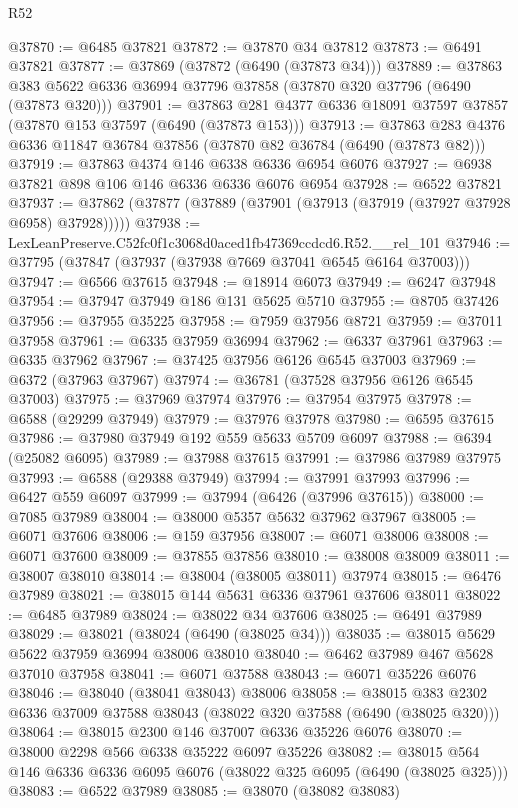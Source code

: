 \begin{lexlean}{R52}
\begin{coremodule}
@37870 := @6485 @37821
@37872 := @37870 @34 @37812
@37873 := @6491 @37821
@37877 := @37869 (@37872 (@6490 (@37873 @34)))
@37889 := @37863 @383 @5622 @6336 @36994 @37796 @37858 (@37870 @320 @37796 (@6490 (@37873 @320)))
@37901 := @37863 @281 @4377 @6336 @18091 @37597 @37857 (@37870 @153 @37597 (@6490 (@37873 @153)))
@37913 := @37863 @283 @4376 @6336 @11847 @36784 @37856 (@37870 @82 @36784 (@6490 (@37873 @82)))
@37919 := @37863 @4374 @146 @6338 @6336 @6954 @6076
@37927 := @6938 @37821 @898 @106 @146 @6336 @6336 @6076 @6954
@37928 := @6522 @37821
@37937 := @37862 (@37877 (@37889 (@37901 (@37913 (@37919 (@37927 @37928 @6958) @37928)))))
@37938 := LexLeanPreserve.C52fc0f1c3068d0aced1fb47369ccdcd6.R52.__rel_101
@37946 := @37795 (@37847 (@37937 (@37938 @7669 @37041 @6545 @6164 @37003)))
@37947 := @6566 @37615
@37948 := @18914 @6073
@37949 := @6247 @37948
@37954 := @37947 @37949 @186 @131 @5625 @5710
@37955 := @8705 @37426
@37956 := @37955 @35225
@37958 := @7959 @37956 @8721
@37959 := @37011 @37958
@37961 := @6335 @37959 @36994
@37962 := @6337 @37961
@37963 := @6335 @37962
@37967 := @37425 @37956 @6126 @6545 @37003
@37969 := @6372 (@37963 @37967)
@37974 := @36781 (@37528 @37956 @6126 @6545 @37003)
@37975 := @37969 @37974
@37976 := @37954 @37975
@37978 := @6588 (@29299 @37949)
@37979 := @37976 @37978
@37980 := @6595 @37615
@37986 := @37980 @37949 @192 @559 @5633 @5709 @6097
@37988 := @6394 (@25082 @6095)
@37989 := @37988 @37615
@37991 := @37986 @37989 @37975
@37993 := @6588 (@29388 @37949)
@37994 := @37991 @37993
@37996 := @6427 @559 @6097
@37999 := @37994 (@6426 (@37996 @37615))
@38000 := @7085 @37989
@38004 := @38000 @5357 @5632 @37962 @37967
@38005 := @6071 @37606
@38006 := @159 @37956
@38007 := @6071 @38006
@38008 := @6071 @37600
@38009 := @37855 @37856
@38010 := @38008 @38009
@38011 := @38007 @38010
@38014 := @38004 (@38005 @38011) @37974
@38015 := @6476 @37989
@38021 := @38015 @144 @5631 @6336 @37961 @37606 @38011
@38022 := @6485 @37989
@38024 := @38022 @34 @37606
@38025 := @6491 @37989
@38029 := @38021 (@38024 (@6490 (@38025 @34)))
@38035 := @38015 @5629 @5622 @37959 @36994 @38006 @38010
@38040 := @6462 @37989 @467 @5628 @37010 @37958
@38041 := @6071 @37588
@38043 := @6071 @35226 @6076
@38046 := @38040 (@38041 @38043) @38006
@38058 := @38015 @383 @2302 @6336 @37009 @37588 @38043 (@38022 @320 @37588 (@6490 (@38025 @320)))
@38064 := @38015 @2300 @146 @37007 @6336 @35226 @6076
@38070 := @38000 @2298 @566 @6338 @35222 @6097 @35226
@38082 := @38015 @564 @146 @6336 @6336 @6095 @6076 (@38022 @325 @6095 (@6490 (@38025 @325)))
@38083 := @6522 @37989
@38085 := @38070 (@38082 @38083)

\end{coremodule}
\end{lexlean}
